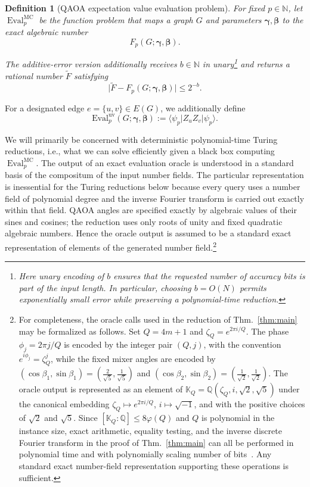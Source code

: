 \documentclass[11pt]{article}
\newtheorem{definition}[theorem]{Definition}
\newcommand{\Eval}{\operatorname{Eval}}
\newcommand{\sh}[1]{{#1}}
\begin{document}
\begin{definition}[QAOA expectation value evaluation problem]
For fixed \(p \in \mathbb{N}\), let $\Eval_p^{\mathrm{MC}}$ be the function problem that maps a  graph $G$ and %
parameters $\boldsymbol\gamma,\boldsymbol\beta$ to the exact algebraic number $$F_p(G;\boldsymbol\gamma,\boldsymbol\beta).$$


The additive-error version %
additionally receives %
$b\in\mathbb{N}$ in %
\sh{unary}\footnote{Here %
unary encoding of $b$ ensures that the requested number of accuracy bits
is part of the input length.  In particular, choosing \(b=O(N)\) permits
exponentially small error while preserving a polynomial-time reduction.}
and returns a rational number
$\widetilde F$ satisfying
$$\bigl|\widetilde F-
F_p(G;\boldsymbol{\gamma},\boldsymbol{\beta})\bigr|
\leq 2^{-b}.$$ 
\end{definition}

For a designated edge \(e=\{u,v\}\in E(G)\), we additionally define
\[
  \mathrm{Eval}^{\mathrm{uv}}_p
  (G;\boldsymbol{\gamma},\boldsymbol{\beta})
  :=
  \langle\psi_p|Z_uZ_v|\psi_p\rangle .
\]








We will primarily be concerned with deterministic polynomial-time Turing reductions, i.e., what we can solve efficiently given a black box computing $\Eval_p^{\mathrm{MC}}$. 
The output of an exact evaluation oracle is understood in a standard basis of the compositum
of the input number fields.  The particular representation is inessential for the Turing
reductions below because every query uses a number field of polynomial degree and the inverse
Fourier transform is carried out exactly within that field.
QAOA angles are specified exactly by algebraic values of their sines and cosines; the reduction
uses only roots of unity and fixed quadratic algebraic numbers.  Hence the oracle output is %
assumed to be a standard exact representation of elements of the %
 generated number field.\footnote{\sh{ %
For completeness, the oracle calls used in the reduction of Thm.~\ref{thm:main} may be
formalized as follows.  Set $Q=4m+1$ and
$\zeta_Q=e^{2\pi i/Q}$.  The phase $\phi_j=2\pi j/Q$ is encoded by
the integer pair $(Q,j)$, with the convention
$e^{i\phi_j}=\zeta_Q^j$, while the fixed mixer angles are encoded by
$(\cos\beta_1,\sin\beta_1)
   =(\tfrac2{\sqrt{5}},\tfrac1{\sqrt{5}})$ and $(\cos\beta_2,\sin\beta_2)
   =(\tfrac{1}{\sqrt{2}},\tfrac{1}{\sqrt{2}})$.
The oracle output is represented as an element of
$\mathbb{K}_Q
   =\mathbb{Q}(\zeta_Q,i,\sqrt{2},\sqrt{5})$
under the canonical embedding
$\zeta_Q\mapsto e^{2\pi i/Q}$, $i\mapsto\sqrt{-1}$, and with the
positive choices of $\sqrt{2}$ and $\sqrt{5}$.  Since
$[\mathbb{K}_Q:\mathbb{Q}]\leq 8\varphi(Q)$ and $Q$ is polynomial
in the instance size, exact arithmetic, equality testing, and the
inverse discrete Fourier transform 
in the proof of Thm.~\ref{thm:main} 
can all be performed in polynomial time
and with polynomially scaling number of bits~\cite{lenstra1982factoring,basu2006algorithms,cohen2013course}.  Any standard exact
number-field representation supporting these operations is
sufficient.} 
}
\end{document}
